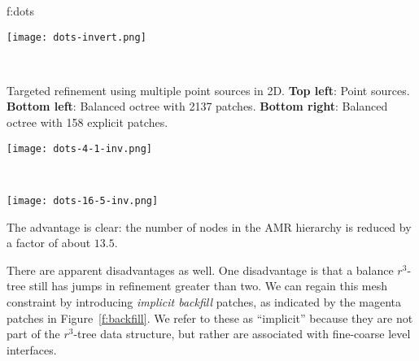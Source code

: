 \documentclass[10pt,twocolumn]{article}
\begin{document}
{f:dots}{
\begin{minipage}{3.2in}
\begin{minipage}{1.5in}
\texttt{[image: dots-invert.png]}
\end{minipage} \ 
\begin{minipage}{1.5in}
\small Targeted refinement using multiple point sources in 2D.
\textbf{Top left}: Point sources.  
\textbf{Bottom left}: Balanced octree with 2137 patches.
\textbf{Bottom right}: Balanced octree with 158 explicit patches.
\end{minipage}
\begin{minipage}{1.5in}
\texttt{[image: dots-4-1-inv.png]}
\end{minipage} \ 
\begin{minipage}{1.5in}
\texttt{[image: dots-16-5-inv.png]}
\end{minipage}
\end{minipage}}


The advantage is clear: the number of nodes in the AMR hierarchy is
reduced by a factor of about $13.5$.  

There are apparent disadvantages as well.  One disadvantage is that a
balance $r^3$-tree still has jumps in refinement greater than two.  We
can regain this mesh constraint by introducing \textit{implicit
  backfill} patches, as indicated by the magenta patches in
Figure~\ref{f:backfill}.  We refer to these as ``implicit'' because
they are not part of the $r^3$-tree data structure, but rather are
associated with fine-coarse level interfaces.
\end{document}
